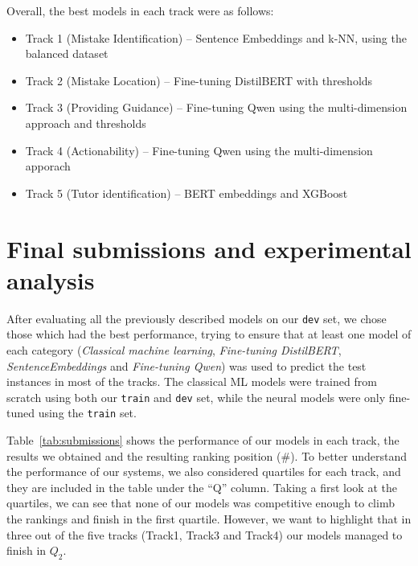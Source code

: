 \documentclass[11pt]{article}
\begin{document}
Overall, the best models in each track were as follows: 
\begin{itemize}
    \setlength\itemsep{0em}
    \item Track 1 (Mistake Identification) -- Sentence Embeddings and k-NN, using the balanced dataset
    \item Track 2 (Mistake Location) -- Fine-tuning DistilBERT with thresholds
    \item Track 3 (Providing Guidance) -- Fine-tuning Qwen using the multi-dimension approach and thresholds
    \item Track 4 (Actionability) -- Fine-tuning Qwen using the multi-dimension apporach
    \item Track 5 (Tutor identification) -- BERT embeddings and XGBoost
\end{itemize}


\section{Final submissions and experimental analysis}
\label{sec:analysis}

After evaluating all the previously described models on our \texttt{dev} set, we chose those which had the best performance, trying to ensure that at least one model of each category (\textit{Classical machine learning}, \textit{Fine-tuning DistilBERT}, \textit{SentenceEmbeddings} and \textit{Fine-tuning Qwen}) was used to predict the test instances in most of the tracks.
The classical ML models were trained from scratch using both our \texttt{train} and \texttt{dev} set, while the neural models were only fine-tuned using the \texttt{train} set.

Table~\ref{tab:submissions} shows the performance of our models in each track, the results we obtained and the resulting ranking position (\#).
To better understand the performance of our systems, we also considered quartiles for each track, and they are included in the table under the ``Q'' column.
Taking a first look at the quartiles, we can see that none of our models was competitive enough to climb the rankings and finish in the first quartile.
However, we want to highlight that in three out of the five tracks (Track1, Track3 and Track4) our models managed to finish in $Q_2$.
\end{document}

